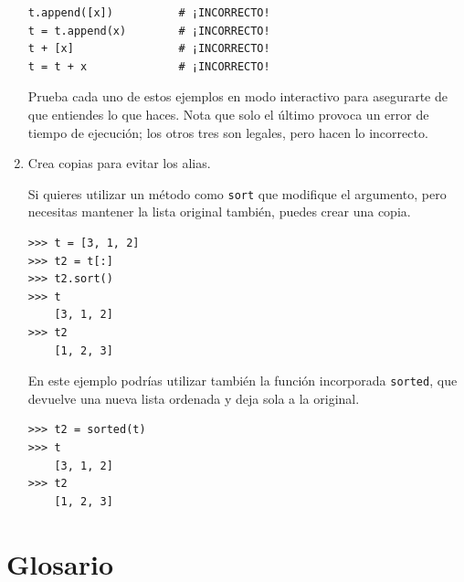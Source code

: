 \documentclass[10pt]{book}
\begin{document}
\begin{enumerate}
\begin{verbatim}
t.append([x])          # ¡INCORRECTO!
t = t.append(x)        # ¡INCORRECTO!
t + [x]                # ¡INCORRECTO!
t = t + x              # ¡INCORRECTO!
\end{verbatim}

Prueba cada uno de estos ejemplos en modo interactivo para asegurarte
de que entiendes lo que haces.  Nota que solo el último
provoca un error de tiempo de ejecución; los otros tres son legales, pero
hacen lo incorrecto.


\item Crea copias para evitar los alias.

Si quieres utilizar un método como {\tt sort} que modifique
el argumento, pero necesitas mantener la lista original
también, puedes crear una copia.

\begin{verbatim}
>>> t = [3, 1, 2]
>>> t2 = t[:]
>>> t2.sort()
>>> t
    [3, 1, 2]
>>> t2
    [1, 2, 3]
\end{verbatim}

En este ejemplo podrías utilizar también la función incorporada {\tt sorted},
que devuelve una nueva lista ordenada y deja sola a la original.

\begin{verbatim}
>>> t2 = sorted(t)
>>> t
    [3, 1, 2]
>>> t2
    [1, 2, 3]
\end{verbatim}

\end{enumerate}



\section{Glosario}
\end{document}
